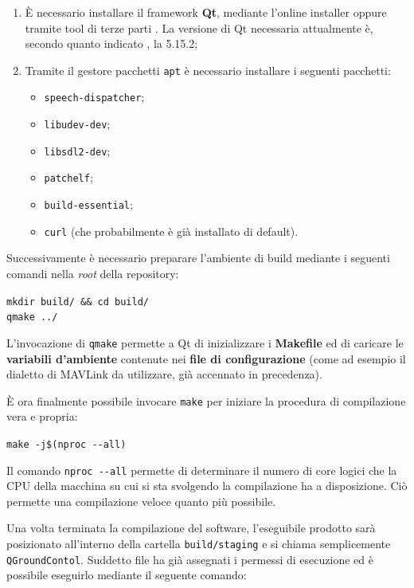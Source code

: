 \documentclass[a4paper, 12pt, oneside]{article}
\theoremstyle{definition}
\begin{document}
\begin{enumerate}
    \item È necessario installare il framework \textbf{Qt}, mediante l'online installer oppure tramite tool di terze parti \cite{aqtinstall}. La versione di Qt necessaria attualmente è, secondo quanto indicato \cite{build-qgc}, la 5.15.2;
    \item Tramite il gestore pacchetti \texttt{apt} è necessario installare i seguenti pacchetti:
        \begin{itemize}
            \item \texttt{speech-dispatcher};
            \item \texttt{libudev-dev};
            \item \texttt{libsdl2-dev};
            \item \texttt{patchelf};
            \item \texttt{build-essential};
            \item \texttt{curl} (che probabilmente è già installato di default).
        \end{itemize}
\end{enumerate}

Successivamente è necessario preparare l'ambiente di build mediante i seguenti comandi nella \textit{root} della repository:

\begin{center}
    \texttt{mkdir build/ \&\& cd build/} \\
    \texttt{qmake ../}
\end{center}

L'invocazione di \texttt{qmake} permette a Qt di inizializzare i \textbf{Makefile} ed di caricare le \textbf{variabili d'ambiente} contenute nei \textbf{file di configurazione} (come ad esempio il dialetto di MAVLink da utilizzare, già accennato in precedenza).

È ora finalmente possibile invocare \texttt{make} per iniziare la procedura di compilazione vera e propria:

\begin{center}
    \texttt{make -j\$(nproc -{}-all)}
\end{center}

Il comando \texttt{nproc -{}-all} permette di determinare il numero di core logici che la CPU della macchina su cui si sta svolgendo la compilazione ha a disposizione. Ciò permette una compilazione veloce quanto più possibile.

Una volta terminata la compilazione del software, l'eseguibile prodotto sarà posizionato all'interno della cartella \texttt{build/staging} e si chiama semplicemente \texttt{QGroundContol}. Suddetto file ha già assegnati i permessi di esecuzione ed è possibile eseguirlo mediante il seguente comando:
\end{document}
